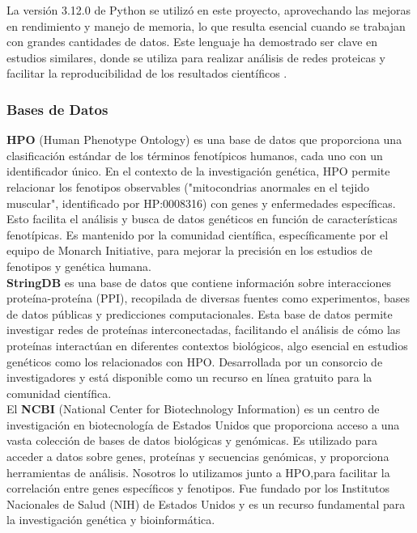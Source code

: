 La versión 3.12.0 de Python se utilizó en este proyecto, aprovechando las mejoras en rendimiento y manejo de memoria, lo que resulta esencial cuando se trabajan con grandes cantidades de datos. Este lenguaje ha demostrado ser clave en estudios similares, donde se utiliza para realizar análisis de redes proteicas y facilitar la reproducibilidad de los resultados científicos \cite{Python_Teams}.


\subsubsection{Bases de Datos}


\textbf{HPO} (Human Phenotype Ontology) es una base de datos que proporciona una clasificación estándar de los términos fenotípicos humanos, cada uno con un identificador único.
En el contexto de la investigación genética, HPO permite relacionar los fenotipos observables ("mitocondrias anormales en el tejido muscular", identificado por HP:0008316) con genes y enfermedades específicas. Esto facilita el análisis y busca de datos genéticos en función de características fenotípicas.
Es mantenido por la comunidad científica, específicamente por el equipo de Monarch Initiative, para mejorar la precisión en los estudios de fenotipos y genética humana.\cite{kohler2014human}\\




\textbf{StringDB} es una base de datos que contiene información sobre interacciones proteína-proteína (PPI), recopilada de diversas fuentes como experimentos, bases de datos públicas y predicciones computacionales.
Esta base de datos permite investigar redes de proteínas interconectadas, facilitando el análisis de cómo las proteínas interactúan en diferentes contextos biológicos, algo esencial en estudios genéticos como los relacionados con HPO.
Desarrollada por un consorcio de investigadores y está disponible como un recurso en línea gratuito para la comunidad científica.\cite{szklarczyk2015string}\\

 

El \textbf{NCBI} (National Center for Biotechnology Information) es un centro de investigación en biotecnología de Estados Unidos que proporciona acceso a una vasta colección de bases de datos biológicas y genómicas.
Es utilizado para acceder a datos sobre genes, proteínas y secuencias genómicas, y proporciona herramientas de análisis. Nosotros lo utilizamos junto a HPO,para facilitar la correlación entre genes específicos y fenotipos.
Fue fundado por los Institutos Nacionales de Salud (NIH) de Estados Unidos y es un recurso fundamental para la investigación genética y bioinformática.\cite{jenuth1999ncbi}




